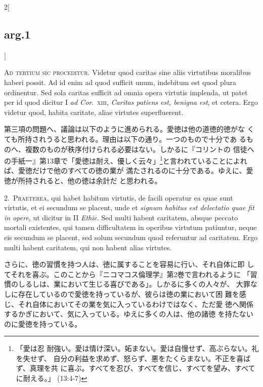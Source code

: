 \documentclass[paper=a4paper,fontsize=10pt,jafontsize=9pt,titlepage]{jlreq}
\begin{document}
\begin{paracol}{2}[\subsection{arg.1}]

{\scshape Ad tertium sic proceditur}. Videtur quod caritas sine aliis
 virtutibus moralibus haberi possit. Ad id enim ad quod sufficit unum,
 indebitum est quod plura ordinentur. Sed sola caritas sufficit ad
 omnia opera virtutis implenda, ut patet per id quod dicitur I
 {\itshape ad Cor}.~{\scshape xiii}, {\itshape Caritas patiens est,
 benigna est}, et cetera. Ergo videtur quod, habita caritate, aliae
 virtutes superfluerent.

\switchcolumn

第三項の問題へ、議論は以下のように進められる。愛徳は他の道徳的徳がな
 くても所持されうると思われる。理由は以下の通り。一つのもので十分であ
 るものへ、複数のものが秩序付けられる必要はない。しかるに『コリントの
 信徒への手紙一』第13章で「愛徳は耐え、優しく云々」\footnote{「愛は忍
 耐強い。愛は情け深い。妬まない。愛は自慢せず、高ぶらない。礼を失せず、
 自分の利益を求めず、怒らず、悪をたくらまない。不正を喜ばず、真理を共
 に喜ぶ。すべてを忍び、すべてを信じ、すべてを望み、すべてに耐える。」
 (13:4-7) }と言われていることによれば、愛徳だけで他のすべての徳の業が
 満たされるのに十分である。ゆえに、愛徳が所持されると、他の徳は余計だ
 と思われる。


2.~{\scshape Praeterea}, qui habet habitum virtutis, de facili
operatur ea quae sunt virtutis, et ei secundum se placent, unde et
{\itshape signum habitus est delectatio quae fit in opere}, ut dicitur
in II {\itshape Ethic}. Sed multi habent caritatem, absque peccato
mortali existentes, qui tamen difficultatem in operibus virtutum
patiuntur, neque eis secundum se placent, sed solum secundum quod
referuntur ad caritatem. Ergo multi habent caritatem, qui non habent
alias virtutes.

\switchcolumn

さらに、徳の習慣を持つ人は、徳に属することを容易に行い、それ自体に即
 してそれを喜ぶ。このことから『ニコマコス倫理学』第2巻で言われるように
 「習慣のしるしは、業において生じる喜びである」。しかるに多くの人々が、
 大罪なしに存在しているので愛徳を持っているが、彼らは徳の業において困
 難を感じ、それ自体においてその業を気に入っているわけではなく、ただ愛
 徳へ関係するかぎにおいて、気に入っている。ゆえに多くの人は、他の諸徳
 を持たないのに愛徳を持っている。


\end{paracol}
\end{document}
